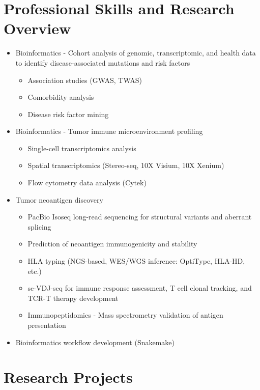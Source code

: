 \documentclass[11pt,a4paper]{article}
\begin{document}
\section*{Professional Skills and Research Overview}

\begin{itemize}[leftmargin=*,nosep]
\item Bioinformatics - Cohort analysis of genomic, transcriptomic, and health data to identify disease-associated mutations and risk factors
  \begin{itemize}[leftmargin=*]
  \item Association studies (GWAS, TWAS)
  \item Comorbidity analysis
  \item Disease risk factor mining
  \end{itemize}
\item Bioinformatics - Tumor immune microenvironment profiling
  \begin{itemize}[leftmargin=*]
  \item Single-cell transcriptomics analysis
  \item Spatial transcriptomics (Stereo-seq, 10X Visium, 10X Xenium)
  \item Flow cytometry data analysis (Cytek)
  \end{itemize}
\item Tumor neoantigen discovery
  \begin{itemize}[leftmargin=*]
  \item PacBio Isoseq long-read sequencing for structural variants and aberrant splicing
  \item Prediction of neoantigen immunogenicity and stability
  \item HLA typing (NGS-based, WES/WGS inference: OptiType, HLA-HD, etc.)
  \item sc-VDJ-seq for immune response assessment, T cell clonal tracking, and TCR-T therapy development
  \item Immunopeptidomics - Mass spectrometry validation of antigen presentation
  \end{itemize}
\item Bioinformatics workflow development (Snakemake)
\end{itemize}

\section*{Research Projects}
\end{document}
